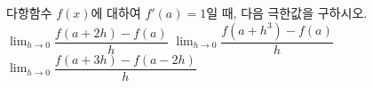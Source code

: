 다항함수 $f(x)$에 대하여 $f'(a)=1$일 때, 다음 극한값을 구하시오.
 $\displaystyle\lim_{h\to 0}\dfrac{f(a+2h)-f(a)}{h}$
 $\displaystyle\lim_{h\to 0}\dfrac{f(a+h^3)-f(a)}{h}$
 $\displaystyle\lim_{h\to 0}\dfrac{f(a+3h)-f(a-2h)}{h}$
